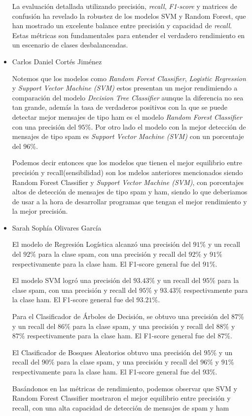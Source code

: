 \begin{itemize}
    La evaluación detallada utilizando precisión, \textit{recall}, \textit{F1-score} y matrices de confusión ha revelado la robustez de los modelos SVM y 
    Random Forest, que han mostrado un excelente balance entre precisión y capacidad de \textit{recall}. Estas métricas son fundamentales para 
    entender el verdadero rendimiento en un escenario de clases desbalanceadas.

    \item Carlos Daniel Cortés Jiménez

    Notemos que los modelos como \textit{Random Forest Classifier}, \textit{Logistic Regression} y \textit{Support Vector Machine (SVM)} estos 
    presentan un mejor rendimiendo a comparación del modelo \textit{Decision Tree Classifier} aunque la diferencia no sea tan grande, además 
    la tasa de verdaderos positivos con la que se puede detectar mejor mensajes de tipo ham es el modelo \textit{Random Forest Classifier} con 
    una precisión del $95\%$. Por otro lado el modelo con la mejor detección de mensajes de tipo spam es \textit{Support Vector Machine (SVM)} 
    con un porcentaje del $96\%$.

    Podemos decir entonces que los modelos que tienen el mejor equilibrio entre precisión y recall(sensibilidad) son los mdelos anteriores 
    mencionados siendo Random Forest Classifier y \textit{Support Vector Machine (SVM)}, con porcentajes altos de detección de mensajes 
    de tipo spam y ham, siendo lo que deberiamos de usar a la hora de desarrollar programas que tengan el mejor rendimiento y la mejor precisión.

\item Sarah Sophía Olivares García

El modelo de Regresión Logística alcanzó una precisión del $91\%$ y un recall del $92\%$ para la clase spam, con una precisión y recall del $92\%$ y $91\%$ respectivamente para la clase ham. El F1-score general fue del $91\%$.

El modelo SVM logró una precisión del $93.43\%$ y un recall del $95\%$ para la clase spam, con una precisión y recall del $95\%$ y $93.43\%$ respectivamente para la clase ham. El F1-score general fue del $93.21\%$.

Para el Clasificador de Árboles de Decisión, se obtuvo una precisión del $87\%$ y un recall del $86\%$ para la clase spam, y una precisión y recall del $88\%$ y $87\%$ respectivamente para la clase ham. El F1-score general fue del $87\%$.

El Clasificador de Bosques Aleatorios obtuvo una precisión del $95\%$ y un recall del $90\%$ para la clase spam, y una precisión y recall del $96\%$ y $91\%$ respectivamente para la clase ham. El F1-score general fue del $93\%$.

Basándonos en las métricas de rendimiento, podemos observar que SVM y Random Forest Classifier mostraron el mejor equilibrio entre precisión y recall, con una alta capacidad de detección de mensajes de spam y ham

\end{itemize}
